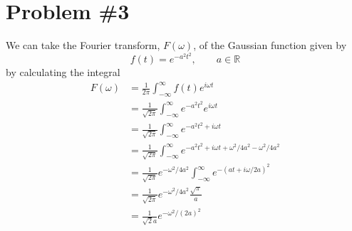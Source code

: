 \documentclass[11pt]{article}
\numberwithin{equation}{section}
\begin{document}
\section{Problem \#3}
We can take the Fourier transform, $F(\omega)$, of the Gaussian function given by
$$f(t) = e^{-a^2t^2},\qquad a\in\mathbb{R}$$
by calculating the integral
\begin{align*}
F(\omega) &= \frac{1}{2\pi}\int_{-\infty}^{\infty}f(t)e^{i\omega{t}}\\
&= \frac{1}{\sqrt{2\pi}}\int_{-\infty}^{\infty}e^{-a^2t^2}e^{i\omega{t}}\\
&= \frac{1}{\sqrt{2\pi}}\int_{-\infty}^{\infty}e^{-a^2t^2+i\omega{t}}\\
&= \frac{1}{\sqrt{2\pi}}\int_{-\infty}^{\infty}e^{-a^2t^2 + i\omega{t} + \omega^2/4a^2 - \omega^2/4a^2}\\
&= \frac{1}{\sqrt{2\pi}}e^{-\omega^2/4a^2}\int_{-\infty}^{\infty}e^{-(at + i\omega/2a)^2} \\
&= \frac{1}{\sqrt{2\pi}}e^{-\omega^2/4a^2}\frac{\sqrt{\pi}}{a}\\
&= \frac{1}{\sqrt{2}a}e^{-\omega^2/(2a)^2}
\end{align*}
\end{document}
